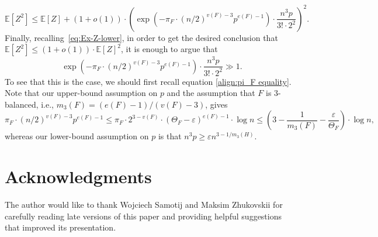 \documentclass[11pt,a4paper,oneside,reqno]{amsart}
\newcommand{\Ex}{\mathbb{E}}
\newcommand{\1}{\mathbbm{1}} %
\newcommand{\eps}{\varepsilon}
\renewcommand{\le}{\leqslant}
\renewcommand{\ge}{\geqslant}
\begin{document}
\[
  \Ex[Z^2] \le \Ex[Z] + (1+o(1)) \cdot \left(\exp\left(-\pi_F \cdot (n/2)^{v(F)-3} p^{e(F)-1}\right) \cdot \frac{n^3 p}{3! \cdot 2^2}\right)^2.
\]
Finally, recalling~\eqref{eq:Ex-Z-lower}, in order to get the desired conclusion that $\Ex[Z^2] \le (1+o(1)) \cdot \Ex[Z]^2$, it is enough to argue that
\[
  \exp\left(-\pi_F \cdot (n/2)^{v(F)-3} p^{e(F)-1}\right) \cdot \frac{n^3 p}{3! \cdot 2^2} \gg 1.
\]
To see that this is the case, we should first recall equation \eqref{align:pi_F equality}. Note that our upper-bound assumption on $p$ and the assumption that $F$ is $3$-balanced, i.e., $m_3(F) = (e(F)-1)/(v(F)-3)$, gives
\[
  \pi_F \cdot (n/2)^{v(F)-3} p^{e(F)-1} \le \pi_F \cdot 2^{3-v(F)} \cdot (\Theta_F-\eps)^{e(F)-1} \cdot \log n \le \left(3-\frac{1}{m_3(F)}-\frac{\eps}{\Theta_F}\right) \cdot \log n,
\]
whereas our lower-bound assumption on $p$ is that $n^3p \ge \eps n^{3-1/m_3(H)}$.

\section*{Acknowledgments}
The author would like to thank Wojciech Samotij and Maksim Zhukovskii for carefully reading late versions of this paper and providing helpful suggestions that improved its presentation.



\end{document}
